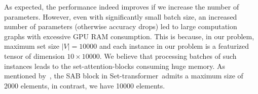 \documentclass{article}
\newcommand{\xhdr}[1]{\noindent\textbf{#1.}}
\newcommand{\settx}{Set-transformer}
\begin{document}
As expected, the performance indeed improves if we increase the number of parameters. However, even with significantly small batch size, an increased number of parameters (otherwise accuracy drops) led to large computation graphs with excessive GPU RAM consumption. This is because, in our problem, maximum set size $|V| = 10000$ and each instance in our problem is a featurized tensor of dimension $10 \times 10000$. We believe that processing batches of such instances leads to the set-attention-blocks consuming huge memory. As mentioned by~\citet[Page\,16]{lee2019set}, the SAB block in \settx\  admits a maximum size of 2000 elements, in contrast, we have 10000 elements.

\end{document}
